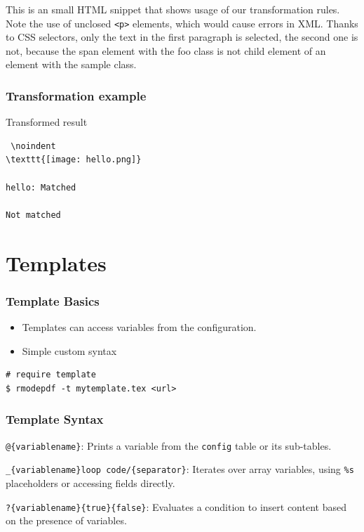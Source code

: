 This is an small HTML snippet that shows usage of our transformation rules.
Note the use of unclosed \verb|<p>| elements, which would cause errors in XML.
Thanks to CSS selectors, only the text in the first paragraph is selected, 
the second one is not, because the span element with the foo class is not child 
element of an element with the sample class.

\begin{frame}[fragile]
\frametitle{Transformation example}
\begin{example}{Transformed result}
\begin{verbatim}
 \noindent 
\texttt{[image: hello.png]}

hello: Matched

Not matched
\end{verbatim}
\end{example}
\end{frame}


\section{Templates}

\begin{frame}[fragile]
  \frametitle{Template Basics}

\begin{itemize}
  \item Templates can access variables from the configuration.
  \item Simple custom syntax
\end{itemize}

\begin{verbatim}
# require template
$ rmodepdf -t mytemplate.tex <url>
\end{verbatim}
\end{frame}



\begin{frame}[fragile]
\frametitle{Template Syntax}
\begin{description}
  \item[Variable Printing] \verb|@{variablename}|: Prints a variable from the \verb|config| table or its sub-tables.
  
  \item[Loops] \verb|_{variablename}loop code/{separator}|: Iterates over array variables, using \verb|%s| placeholders or accessing fields directly.
  
  \item[Conditions] \verb|?{variablename}{true}{false}|: Evaluates a condition to insert content based on the presence of variables.
\end{description}

\end{frame}

